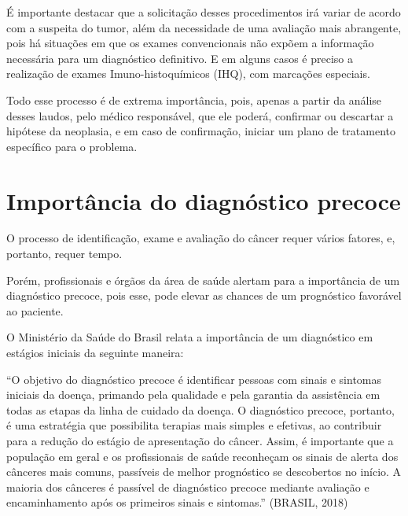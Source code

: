 É importante destacar que a solicitação desses procedimentos irá variar de acordo com a suspeita do tumor, além da necessidade de uma avaliação mais abrangente, pois há situações em que os exames convencionais não expõem a informação necessária para um diagnóstico definitivo. E em alguns casos é preciso a realização de exames Imuno-histoquímicos (IHQ), com marcações especiais.

Todo esse processo é de extrema importância, pois, apenas a partir da análise desses laudos, pelo médico responsável, que ele poderá, confirmar ou descartar a hipótese da neoplasia, e em caso de confirmação, iniciar um plano de tratamento específico para o problema.


\section{\textbf{Importância do diagnóstico precoce}}

O processo de identificação, exame e avaliação do câncer requer vários fatores, e, portanto, requer tempo.

Porém, profissionais e órgãos da área de saúde alertam para a importância de um diagnóstico precoce, pois esse, pode elevar as chances de um prognóstico favorável ao paciente.

O Ministério da Saúde do Brasil relata a importância de um diagnóstico em estágios iniciais da seguinte maneira:

“O objetivo do diagnóstico precoce é identificar pessoas com sinais e sintomas iniciais da doença, primando pela qualidade e pela garantia da assistência em todas as etapas da linha de cuidado da doença. O diagnóstico precoce, portanto, é uma estratégia que possibilita terapias mais simples e efetivas, ao contribuir para a redução do estágio de apresentação do câncer. Assim, é importante que a população em geral e os profissionais de saúde reconheçam os sinais de alerta dos cânceres mais comuns, passíveis de melhor prognóstico se descobertos no início. A maioria dos cânceres é passível de diagnóstico precoce mediante avaliação e encaminhamento após os primeiros sinais e sintomas.” (BRASIL, 2018)\cite{DIAGNOSTICO}

